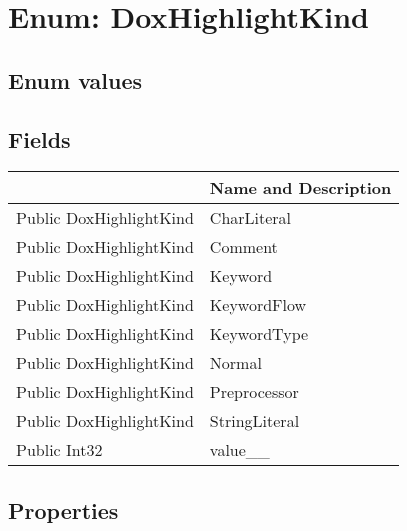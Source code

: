 \documentclass[11pt, oneside, a4paper]{book}
\begin{document}
\section{Enum: DoxHighlightKind}

\subsection{Enum values}

\subsection{Fields}
\begin{center}
\begin{tabular}{| p{3cm} | p{12cm} | }
\hline
\textbf{ } & \textbf{ Name and Description}\\
\hline
 Public  DoxHighlightKind &  CharLiteral\hypertarget{SoftwareEngineeringTools.{}Documentation.{}DoxHighlightKind.{}CharLiteral}{}\\
\hline
 Public  DoxHighlightKind &  Comment\hypertarget{SoftwareEngineeringTools.{}Documentation.{}DoxHighlightKind.{}Comment}{}\\
\hline
 Public  DoxHighlightKind &  Keyword\hypertarget{SoftwareEngineeringTools.{}Documentation.{}DoxHighlightKind.{}Keyword}{}\\
\hline
 Public  DoxHighlightKind &  KeywordFlow\hypertarget{SoftwareEngineeringTools.{}Documentation.{}DoxHighlightKind.{}KeywordFlow}{}\\
\hline
 Public  DoxHighlightKind &  KeywordType\hypertarget{SoftwareEngineeringTools.{}Documentation.{}DoxHighlightKind.{}KeywordType}{}\\
\hline
 Public  DoxHighlightKind &  Normal\hypertarget{SoftwareEngineeringTools.{}Documentation.{}DoxHighlightKind.{}Normal}{}\\
\hline
 Public  DoxHighlightKind &  Preprocessor\hypertarget{SoftwareEngineeringTools.{}Documentation.{}DoxHighlightKind.{}Preprocessor}{}\\
\hline
 Public  DoxHighlightKind &  StringLiteral\hypertarget{SoftwareEngineeringTools.{}Documentation.{}DoxHighlightKind.{}StringLiteral}{}\\
\hline
 Public  Int32 &  value\_\_\hypertarget{SoftwareEngineeringTools.{}Documentation.{}DoxHighlightKind.{}value\_\_}{}\\
\hline
\end{tabular}
\end{center}

\subsection{Properties}
\end{document}
